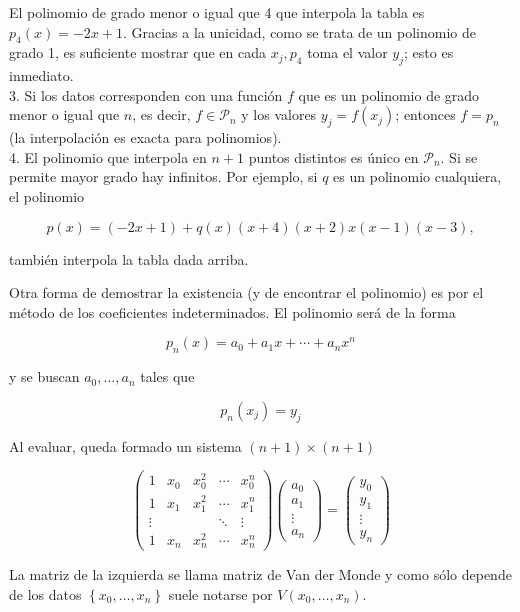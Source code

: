 \documentclass[10pt]{book}
\begin{document}
El polinomio de grado menor o igual que 4 que interpola la tabla es $p_{4}(x)=-2 x+1$. Gracias a la unicidad, como se trata de un polinomio de grado 1, es suficiente mostrar que en cada $x_{j}, p_{4}$ toma el valor $y_{j}$; esto es inmediato.\\
3. Si los datos corresponden con una función $f$ que es un polinomio de grado menor o igual que $n$, es decir, $f \in \mathcal{P}_{n}$ y los valores $y_{j}=f\left(x_{j}\right)$; entonces $f=p_{n}$ (la interpolación es exacta para polinomios).\\
4. El polinomio que interpola en $n+1$ puntos distintos es único en $\mathcal{P}_{n}$. Si se permite mayor grado hay infinitos. Por ejemplo, si $q$ es un polinomio cualquiera, el polinomio

$$
p(x)=(-2 x+1)+q(x)(x+4)(x+2) x(x-1)(x-3),
$$

también interpola la tabla dada arriba.

Otra forma de demostrar la existencia (y de encontrar el polinomio) es por el método de los coeficientes indeterminados. El polinomio será de la forma

$$
p_{n}(x)=a_{0}+a_{1} x+\cdots+a_{n} x^{n}
$$

y se buscan $a_{0}, \ldots, a_{n}$ tales que

$$
p_{n}\left(x_{j}\right)=y_{j}
$$

Al evaluar, queda formado un sistema $(n+1) \times(n+1)$

$$
\left(\begin{array}{ccccc}
1 & x_{0} & x_{0}^{2} & \cdots & x_{0}^{n} \\
1 & x_{1} & x_{1}^{2} & \cdots & x_{1}^{n} \\
\vdots & & & \ddots & \vdots \\
1 & x_{n} & x_{n}^{2} & \cdots & x_{n}^{n}
\end{array}\right)\left(\begin{array}{c}
a_{0} \\
a_{1} \\
\vdots \\
a_{n}
\end{array}\right)=\left(\begin{array}{c}
y_{0} \\
y_{1} \\
\vdots \\
y_{n}
\end{array}\right)
$$

La matriz de la izquierda se llama matriz de Van der Monde y como sólo depende de los datos $\left\{x_{0}, \ldots, x_{n}\right\}$ suele notarse por $V\left(x_{0}, \ldots, x_{n}\right)$.
\end{document}
